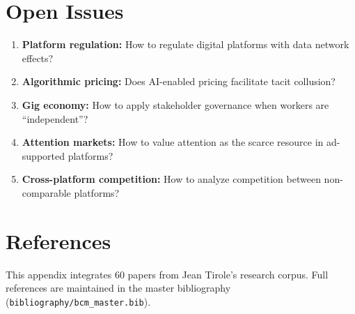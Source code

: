 \section{Open Issues}
\label{sec:jt-open}

\begin{enumerate}
    \item \textbf{Platform regulation:} How to regulate digital platforms with data network effects?
    \item \textbf{Algorithmic pricing:} Does AI-enabled pricing facilitate tacit collusion?
    \item \textbf{Gig economy:} How to apply stakeholder governance when workers are ``independent''?
    \item \textbf{Attention markets:} How to value attention as the scarce resource in ad-supported platforms?
    \item \textbf{Cross-platform competition:} How to analyze competition between non-comparable platforms?
\end{enumerate}

\section{References}
\label{sec:jt-references}

\nocite{bcm_master}

This appendix integrates 60 papers from Jean Tirole's research corpus. Full references are maintained in the master bibliography (\texttt{bibliography/bcm\_master.bib}).

